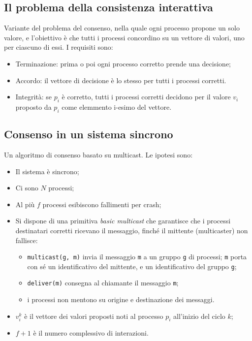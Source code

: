\subsection{Il problema della consistenza interattiva}
Variante del problema del consenso, nella quale ogni processo propone un solo valore, e l'obiettivo è che tutti i processi concordino su un vettore di valori, uno per ciascuno di essi. I requisiti sono:
\begin{itemize}
    \item Terminazione: prima o poi ogni processo corretto prende una decisione;
    \item Accordo: il vettore di decisione è lo stesso per tutti i processi corretti.
    \item Integrità: se $p_{i}$ è corretto, tutti i processi corretti decidono per il valore $v_{i}$ proposto da $p_{i}$ come elemmento i-esimo del vettore.
\end{itemize}
\subsection{Consenso in un sistema sincrono}
Un algoritmo di consenso basato su multicast. Le ipotesi sono:
\begin{itemize}
    \item Il sistema è sincrono;
    \item Ci sono $N$ processi;
    \item Al più $f$ processi esibiscono fallimenti per crash;
    \item Si dispone di una primitiva \textit{basic multicast} che garantisce che i processi destinatari corretti ricevano il messaggio, finché il mittente (multicaster) non fallisce:
    \begin{itemize}
        \item \texttt{multicast(g, m)} invia il messaggio \texttt{m} a un gruppo \texttt{g} di processi; \texttt{m} porta con sé un identificativo del mittente, e un identificativo del gruppo \texttt{g};
        \item \texttt{deliver(m)} consegna al chiamante il messaggio \texttt{m};
        \item i processi non mentono su origine e destinazione dei messaggi.
    \end{itemize}
    \item $v_{i}^{k}$ è il vettore dei valori proposti noti al processo $p_{i}$ all'inizio del ciclo $k$;
    \item $f+1$ è il numero complessivo di interazioni.
\end{itemize}

